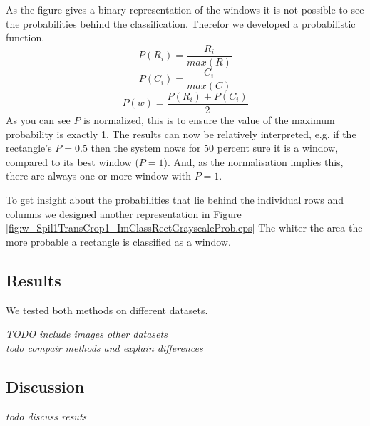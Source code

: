 As the figure gives a binary representation of the windows it is not possible
to see the probabilities behind the classification.
Therefor we developed a probabilistic function. 
\[P(R_i) = \frac{R_i}{max(R)}\]
\[P(C_i) = \frac{C_i}{max(C)}\]
\[P(w) = \frac{P(R_i) + P(C_i)}{2}\]
As you can see $P$ is normalized, this is to ensure the value of the maximum
probability is exactly 1. The results can now be relatively interpreted, e.g. if the rectangle's $P=0.5$
then the system nows for 50 percent sure it is a window, compared to its best window ($P=1$). 
And, as the normalisation implies this, there are always one or more window with $P=1$. 

To get insight about the probabilities that lie behind the individual rows and columns
we designed another representation in Figure \ref{fig:w_Spil1TransCrop1_ImClassRectGrayscaleProb.eps}
The whiter the area the more probable a rectangle is classified as a window.



\subsection{Results}
We tested both methods on different datasets.




\emph{TODO include images other datasets} \\
\emph{todo compair methods and explain differences}


\subsection{Discussion}  %
\emph{ todo discuss resuts }
